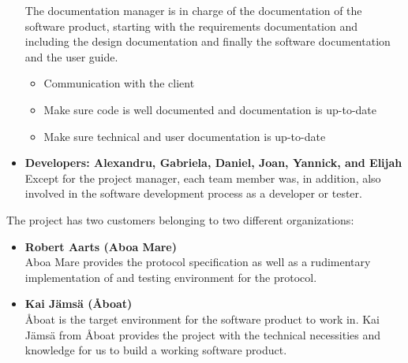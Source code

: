 \begin{itemize}
		The documentation manager is in charge of the documentation of the software product, starting with the requirements documentation and including the design documentation and finally the software documentation and the user guide.
		\begin{itemize}
			\item Communication with the client
			\item Make sure code is well documented and documentation is up-to-date
			\item Make sure technical and user documentation is up-to-date
		\end{itemize}
	\item \textbf{Developers: Alexandru, Gabriela,  Daniel,  Joan, Yannick, and Elijah} \\
		Except for the project manager, each team member was, in addition, also involved in the software development process as a developer or tester.
\end{itemize}

\noindent
The project has two customers belonging to two different organizations:

\begin{itemize}
	\item \textbf{Robert Aarts (Aboa Mare)} \\
		Aboa Mare provides the protocol specification as well as a rudimentary implementation of and testing environment for the protocol.
	\item \textbf{Kai Jämsä (Åboat)} \\
		Åboat is the target environment for the software product to work in. Kai Jämsä from Åboat provides the project with the technical necessities and knowledge for us to build a working software product.
\end{itemize}

